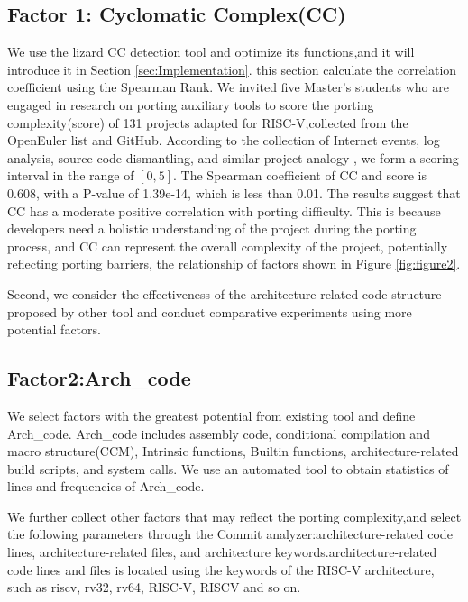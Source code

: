 \documentclass[sigconf,screen,review,anonymous]{acmart}
\begin{document}
\subsection{Factor 1: Cyclomatic Complex(CC)}
\label{sec:factor-1}
We use the lizard CC detection tool and optimize its functions,and it will introduce it in Section \ref{sec:Implementation}.
this section calculate the correlation coefficient using the Spearman Rank.
We invited five Master's students who are engaged in research on porting auxiliary tools to score the porting complexity(score) of 131 projects adapted for RISC-V,collected from the OpenEuler list\citep{stage2023} and GitHub.
According to the collection of Internet events, log analysis, source code dismantling, and similar project analogy \cite{liangguanyu2020}, we form a scoring interval in the range of $[0,5]$.
The Spearman coefficient of CC and score is 0.608, with a P-value of 1.39e-14, which is less than 0.01.
The results suggest that CC has a moderate positive correlation with porting difficulty.
This is because developers need a holistic understanding of the project during the porting process, and CC can represent the overall complexity of the project, potentially reflecting porting barriers, the relationship of factors shown in Figure \ref{fig:figure2}.




Second, we consider the effectiveness of the architecture-related code structure proposed by other tool and conduct comparative experiments using more potential factors.
\subsection{Factor2:Arch\_code}

We select factors with the greatest potential from existing tool and define Arch\_code.
Arch\_code includes assembly code, conditional compilation and macro structure(CCM), Intrinsic functions, Builtin functions, architecture-related build scripts, and system calls.
We use an automated tool to obtain statistics of lines and frequencies of Arch\_code.

We further collect other factors that may reflect the porting complexity,and select the following parameters through the Commit analyzer:architecture-related code lines, architecture-related files, and architecture keywords.architecture-related code lines and files is located using the keywords of the RISC-V architecture, such as riscv, rv32, rv64, RISC-V, RISCV and so on.
\end{document}
